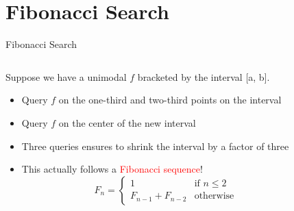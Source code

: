 \documentclass{beamer}
\begin{document}
\section{Fibonacci Search}
\begin{frame}{Fibonacci Search}
\begin{columns}
\begin{column}{.6\textwidth}
Suppose we have a unimodal $f$ bracketed by the interval [a, b].
\begin{itemize}
    \item Query $f$ on the one-third and two-third points on the interval
    \item Query $f$ on the center of the new interval
    \item Three queries ensures to shrink the interval by a factor of three
    \item \cdots
    
This actually follows a \textcolor{red}{Fibonacci sequence}!
\begin{equation*}
F_n = 
    \begin{cases}
    1 & \textrm{if~} n\leq 2\\
    F_{n-1} + F_{n-2} & \textrm{otherwise}
    \end{cases}
\end{equation*}
\end{itemize}
\end{column}
\begin{column}{.4\textwidth}
\\
\\
\\\\\\\
\end{column}
\end{columns}

\end{frame}
\end{document}
